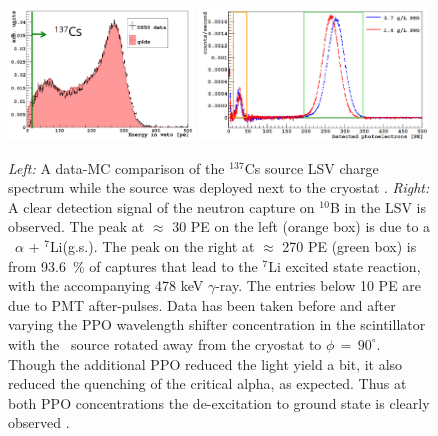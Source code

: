 \begin{figure}[htbp]
\centering
\includegraphics[width=0.44\textwidth]{./Figures/137Cs_Veto_Paolo_G4DS_UCLA}
\includegraphics[width=0.54\textwidth]{./Figures/AmBe_LSV_VetoPaper}
\caption{\textit{Left:} A data-MC comparison of the $^{137}$Cs source LSV charge spectrum while the source was deployed next to the cryostat \cite{DS50:G4DS:paper}.
\textit{Right:} A clear detection signal of the neutron capture on $^{10}$B in the LSV is observed. The peak at $\approx$ 30 PE on the left (orange box) is due to a \enbortengroundalpha\ $\alpha$ + $^7$Li(g.s.). The peak on the right at $\approx$ 270 PE (green box) is from 93.6~\% of captures that lead to the $^7$Li excited state reaction, with the accompanying 478 keV $\gamma$-ray. The entries below 10 PE are due to PMT after-pulses. Data has been taken before and after varying the PPO wavelength shifter concentration in the scintillator with the \AmBe\ source rotated away from the cryostat to $\phi\,=\,90^{\circ}$. Though the additional PPO reduced the light yield a bit, it also reduced the quenching of the critical alpha, as expected. Thus at both PPO concentrations the de-excitation to ground state is clearly observed \cite{Agnes:2015qyz}.
\label{fig:LSV:Calib}} 
\end{figure}

